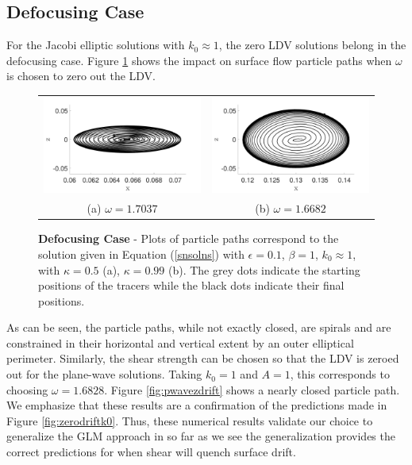 \documentclass{JFM_Style/jfm}
\begin{document}
\subsection{Defocusing Case}

For the Jacobi elliptic solutions with $k_{0}\approx 1$, the zero LDV solutions belong in the defocusing case.  Figure \ref{fig:jaczerodrift} shows the impact on surface flow particle paths when $\omega$ is chosen to zero out the LDV.
\begin{figure}
\centering
\begin{tabular}{cc}
\includegraphics[width=.48\textwidth]{track_ep_pt1_tf_1_w_1pt704_kap_pt5_foc} & \includegraphics[width=.48\textwidth]{track_ep_pt1_tf_1_w_1pt668_kap_pt99_foc} \\
(a) $\omega=1.7037$ & (b) $\omega=1.6682$ 
\end{tabular}
\caption{\small {\bf Defocusing Case} - Plots of particle paths correspond to the solution given in Equation (\ref{snsolns}) with $\epsilon=0.1$, $\beta=1$, $k_{0}\approx 1$, with $\kappa=0.5$  (a), $\kappa=0.99$ (b). The grey dots indicate the starting positions of the tracers while the black dots indicate their final positions.}
\label{fig:jaczerodrift}
\end{figure}
As can be seen, the particle paths, while not exactly closed, are spirals and are constrained in their horizontal and vertical extent by an outer elliptical perimeter.  Similarly, the shear strength can be chosen so that the LDV is zeroed out for the plane-wave solutions.  Taking $k_{0}=1$ and $A=1$, this corresponds to choosing $\omega = 1.6828$.  Figure \ref{fig:pwavezdrift} shows a nearly closed particle path.  We emphasize that these results are a confirmation of the predictions made in Figure \ref{fig:zerodriftk0}.  Thus, these numerical results validate our choice to generalize the GLM approach in so far as we see the generalization provides the correct predictions for when shear will quench surface drift.
\end{document}
